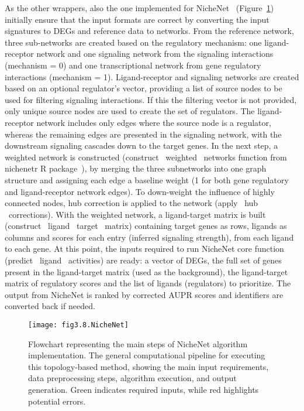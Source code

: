 As the other wrappers, also the one implemented for NicheNet~\cite{RN42} (Figure~\ref{fig:fig3.8.NicheNet}) initially ensure that the input formats are correct by converting the input signatures to \gls{DEGs} and reference data to networks. From the reference network, three sub-networks are created based on the regulatory mechanism: one ligand-receptor network and one signaling network from the signaling interactions (mechanism = 0) and one transcriptional network from gene regulatory interactions (mechanism = 1). Ligand-receptor and signaling networks are created based on an optional regulator's vector, providing a list of source nodes to be used for filtering signaling interactions. 
If this the filtering vector is not provided, only unique source nodes are used to create the set of regulators. The ligand-receptor network includes only edges where the source node is a regulator, whereas the remaining edges are presented in the signaling network, with the downstream signaling cascades down to the target genes. In the next step, a weighted network is constructed (construct \ weighted \ networks function from nichenetr \gls{R} package~\cite{RN42}), by merging the three subnetworks into one graph structure and assigning each edge a baseline weight (1 for both gene regulatory and ligand-receptor network edges). 
To down-weight the influence of highly connected nodes, hub correction is applied to the network (apply \ hub \ corrections). With the weighted network, a ligand-target matrix is built (construct \ ligand \ target \ matrix) containing target genes as rows, ligands as columns and scores for each entry (inferred signaling strength), from each ligand to each gene. At this point, the inputs required to run NicheNet core function (predict \ ligand \ activities) are ready: a vector of \gls{DEGs}, the full set of genes present in the ligand-target matrix (used as the background), the ligand-target matrix of regulatory scores and the list of ligands (regulators) to prioritize. The output from NicheNet is ranked by corrected \gls{AUPR} scores and identifiers are converted back if needed.

\begin{figure}[htbp]
    \centering
    \texttt{[image: fig3.8.NicheNet]}
    \caption[Flowchart representing the main steps of NicheNet algorithm implementation.]{Flowchart representing the main steps of NicheNet algorithm implementation. The general computational pipeline for executing this topology-based method, showing the main input requirements, data preprocessing steps, algorithm execution, and output generation. Green indicates required inputs, while red highlights potential errors.}
    \label{fig:fig3.8.NicheNet}
\end{figure}

